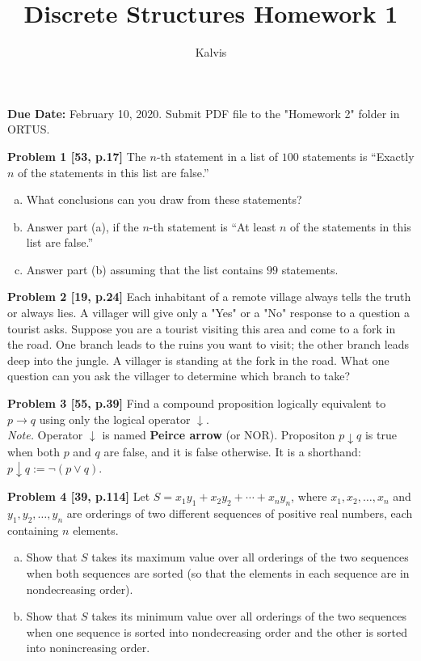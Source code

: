 \documentclass[jou]{apa6}
\title{Discrete Structures \textendash{} Homework 1}
\author{Kalvis}
\affiliation{RBS}
\begin{document}
\maketitle
\noindent
{\bf Due Date:} February 10, 2020. Submit PDF file to the "Homework 2" folder in ORTUS.

\vspace{2ex}
{\bf Problem 1 [53, p.17]} The $n$-th statement in a list of $100$ statements is
``Exactly $n$ of the statements in this list are false.'' 
\begin{enumerate}[(a)]
\item What conclusions can you draw from these statements?
\item Answer part (a), if the $n$-th statement is ``At least $n$ of 
the statements in this list are false.''
\item Answer part (b) assuming that the list contains $99$ statements.
\end{enumerate}

\vspace{2ex}
{\bf Problem 2 [19, p.24]} Each inhabitant of a remote village always tells the 
truth or always lies. A villager will give only a "Yes" or a "No" response
to a question a tourist asks. Suppose you are a tourist visiting this area and come
to a fork in the road. One branch leads to the ruins you want to visit; the
other branch leads deep into the jungle. A villager is standing at the fork in the road. 
What one question can you ask the villager to determine which branch to take?

\vspace{2ex}
{\bf Problem 3 [55, p.39]} 
Find a compound proposition logically equivalent to $p \rightarrow q$ using 
only the logical operator $\downarrow$.\\
{\em Note.} Operator $\downarrow$ is named {\bf Peirce arrow} (or NOR). 
Propositon $p \downarrow q$ is true when both $p$ and $q$ are false, and it is 
false otherwise. It is a shorthand: $p \downarrow q := \neg(p \vee q)$. 

\vspace{2ex}
{\bf Problem 4 [39, p.114]} 
Let $S = x_1y_1 + x_2y_2 + \cdots + x_ny_n$, where $x_1,x_2,\ldots,x_n$
and $y_1,y_2,\ldots,y_n$ are orderings of two different sequences
of positive real numbers, each containing $n$ elements.
\begin{enumerate}[(a)]
\item Show that $S$ takes its maximum value over all orderings of the two 
sequences when both sequences are sorted (so that the elements in each 
sequence are in nondecreasing order). 
\item Show that $S$ takes its minimum value over all orderings of the two 
sequences when one sequence is sorted into nondecreasing order and the other 
is sorted into nonincreasing order.
\end{enumerate}
\end{document}
